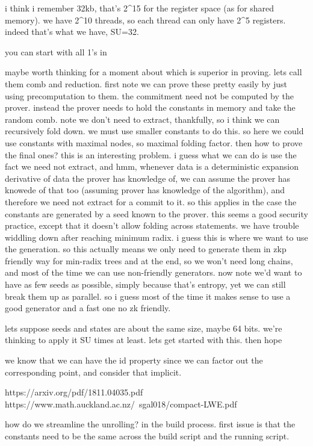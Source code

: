 i think i remember 32kb, that's 2^15 for the register space (as for shared memory).
we have 2^10 threads, so each thread can only have 2^5 registers. indeed that's what we have, SU=32.



you can start with all 1's in 

maybe worth thinking for a moment about which is superior in proving. 
lets call them comb and reduction.
first note we can prove these pretty easily by just using precomputation to them. the commitment need not be computed by the prover. instead the prover needs to hold the constants in memory and take the random comb. note we don't need to extract, thankfully, so i think we can recursively fold down. we must use smaller constants to do this. so here we could use constants with maximal nodes, so maximal folding factor. then how to prove the final ones? this is an interesting problem. i guess what we can do is use the fact we need not extract, and 
hmm, whenever data is a deterministic expansion derivative of data the prover has knowledge of, we can assume the prover has knowede of that too (assuming prover has knowledge of the algorithm), and therefore we need not extract for a commit to it. so this applies in the case the constants are generated by a seed known to the prover. this seems a good security practice, except that it doesn't allow folding across statements.
we have trouble widdling down after reaching minimum radix. i guess this is where we want to use the generation. so this actually means we only need to generate them in zkp friendly way for min-radix trees and at the end, so we won't need long chains, and most of the time we can use non-friendly generators. now note we'd want to have as few seeds as possible, simply because that's entropy, yet we can still break them up as parallel. 
so i guess most of the time it makes sense to use a good generator and a fast one no zk friendly. 

lets suppose seeds and states are about the same size, maybe 64 bits. 
we're thinking to apply it SU times at least.
lets get started with this. then hope

we know that we can have the id property since we can factor out the corresponding point, and consider that implicit. 



https://arxiv.org/pdf/1811.04035.pdf
https://www.math.auckland.ac.nz/~sgal018/compact-LWE.pdf



how do we streamline the unrolling?
in the build process. 
first issue is that the constants need to be the same across the build script and the running script. 

